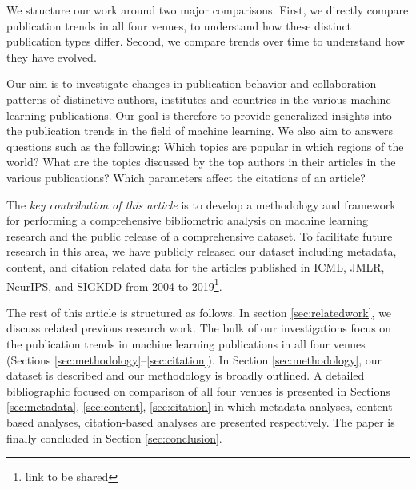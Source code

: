 We structure our work around two major comparisons. First, we directly compare publication trends in all four venues, to understand how these distinct publication types differ. Second, we compare trends over time to understand how they have evolved. 

Our aim is to investigate changes in publication behavior and collaboration patterns of distinctive authors, institutes and countries in the various machine learning publications. Our goal is therefore to provide generalized insights into the publication trends in the field of machine learning. We also aim to answers questions such as the following: Which topics are popular in which regions of the world? What are the topics discussed by the top authors in their articles in the various publications? Which parameters affect the citations of an article? 

The \textit{key contribution of this article} is to develop a methodology and framework for performing a comprehensive bibliometric analysis on machine learning research and the public release of a comprehensive dataset. To facilitate future research in this area, we have publicly released our dataset including metadata, content, and citation related data for the articles published in ICML, JMLR, NeurIPS, and SIGKDD from 2004 to 2019\footnote{link to be shared}.   

The rest of this article is structured as follows. In section \ref{sec:relatedwork}, we discuss related previous research work. The bulk of our investigations focus on the publication trends in machine learning publications in all four venues (Sections \ref{sec:methodology}--\ref{sec:citation}). In Section \ref{sec:methodology}, our dataset is described and our methodology is broadly outlined. A detailed bibliographic focused on comparison of all four venues is presented in Sections \ref{sec:metadata}, \ref{sec:content}, \ref{sec:citation} in which metadata analyses, content-based analyses, citation-based analyses are presented respectively. The paper is finally concluded in Section \ref{sec:conclusion}.

